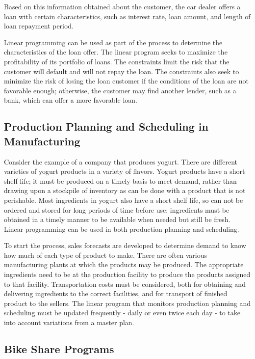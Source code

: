 Based on this information obtained about the customer, the car dealer offers a loan with certain characteristics, such as interest rate, loan amount, and length of loan repayment period.

Linear programming can be used as part of the process to determine the characteristics of the loan offer. The linear program seeks to maximize the profitability of its portfolio of loans. The constraints limit the risk that the customer will default and will not repay the loan. The constraints also seek to minimize the risk of losing the loan customer if the conditions of the loan are not favorable enough; otherwise, the customer may find another lender, such as a bank, which can offer a more favorable loan.

\subsection{Production Planning and Scheduling in Manufacturing}

Consider the example of a company that produces yogurt. There are different varieties of yogurt products in a variety of flavors. Yogurt products have a short shelf life; it must be produced on a timely basis to meet demand, rather than drawing upon a stockpile of inventory as can be done with a product that is not perishable. Most ingredients in yogurt also have a short shelf life, so can not be ordered and stored for long periods of time before use; ingredients must be obtained in a timely manner to be available when needed but still be fresh. Linear programming can be used in both production planning and scheduling.

To start the process, sales forecasts are developed to determine demand to know how much of each type of product to make. There are often various manufacturing plants at which the products may be produced. The appropriate ingredients need to be at the production facility to produce the products assigned to that facility. Transportation costs must be considered, both for obtaining and delivering ingredients to the correct facilities, and for transport of finished product to the sellers. The linear program that monitors production planning and scheduling must be updated frequently - daily or even twice each day - to take into account variations from a master plan.

\subsection{Bike Share Programs}

